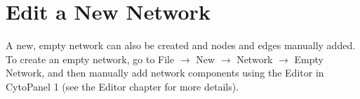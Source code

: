 \section{Edit a New Network}
 A new, empty network can also be created and nodes and edges manually added. To create an empty network, go to File $\rightarrow$ New $\rightarrow$ Network $\rightarrow$ Empty Network, and then manually add network components using the Editor in CytoPanel 1 (see the Editor chapter for more details). 
